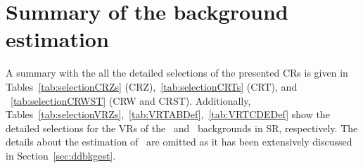 \chapter{Summary of the background estimation}
\label{app:sumbkgest}
	
	A summary with the all the detailed selections of the presented \acp{CR} is given in Tables~\ref{tab:selectionCRZs} (CRZ),~\ref{tab:selectionCRTs} (CRT), and ~\ref{tab:selectionCRWST} (CRW and CRST). Additionally, Tables~\ref{tab:selectionVRZs},~\ref{tab:VRTABDef},~\ref{tab:VRTCDEDef} show the detailed selections for the \acp{VR} of the \Zjets\ and \ttbar\ backgrounds in \ac{SR}, respectively. The details about the estimation of \ttZ\ are omitted as it has been extensively discussed in Section~\ref{sec:ddbkgest}. 

